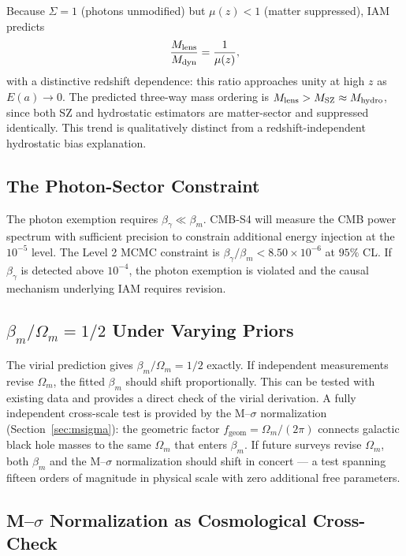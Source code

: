 \documentclass[twocolumn,a4paper,aps,prd,twocolumn,showpacs,notitlepage,superscriptaddress,nofootinbib]{article}
\newcommand{\betam}{\beta_{m}}
\begin{document}
Because $\Sigma = 1$ (photons unmodified) but $\mu(z) < 1$ (matter
suppressed), IAM predicts
\begin{equation}
  \frac{M_{\rm lens}}{M_{\rm dyn}} = \frac{1}{\mu(z)},
\end{equation}
with a distinctive redshift dependence: this ratio approaches unity at high $z$
as $E(a) \to 0$.  The predicted three-way mass ordering is
$M_{\rm lens} > M_{\rm SZ} \approx M_{\rm hydro}$, since both SZ and
hydrostatic estimators are matter-sector and suppressed identically.  This
trend is qualitatively distinct from a redshift-independent hydrostatic bias
explanation.

\subsection{The Photon-Sector Constraint}

The photon exemption requires $\beta_\gamma \ll \beta_m$.  CMB-S4 will measure
the CMB power spectrum with sufficient precision to constrain additional energy
injection at the $10^{-5}$ level.  The Level 2 MCMC constraint is
$\beta_\gamma/\beta_m < 8.50 \times 10^{-6}$ at $95\%$ CL.  If $\beta_\gamma$
is detected above $10^{-4}$, the photon exemption is violated and the causal
mechanism underlying IAM requires revision.

\subsection{$\beta_m/\Omega_m = 1/2$ Under Varying Priors}

The virial prediction gives $\beta_m/\Omega_m = 1/2$ exactly.  If independent
measurements revise $\Omega_m$, the fitted $\beta_m$ should shift
proportionally.  This can be tested with existing data and provides a direct
check of the virial derivation.  A fully independent cross-scale test is provided by
the M--$\sigma$ normalization (Section~\ref{sec:msigma}): the geometric
factor $f_\mathrm{geom} = \Omega_m/(2\pi)$ connects galactic black hole
masses to the same $\Omega_m$ that enters $\betam$.  If future surveys revise
$\Omega_m$, both $\betam$ and the M--$\sigma$ normalization should shift in
concert --- a test spanning fifteen orders of magnitude in physical scale with
zero additional free parameters.

\subsection{M--$\sigma$ Normalization as Cosmological Cross-Check}
\end{document}
